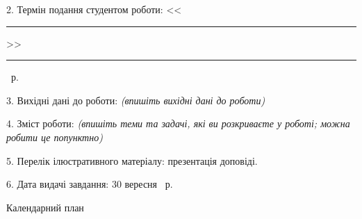 2. Термін подання студентом роботи: <<\rule{0.5cm}{0.25pt}>> \rule{2.5cm}{0.25pt} \YearOfDefence~р.

3. Вихідні дані до роботи: \emph{(впишіть вихідні дані до роботи)}

4. Зміст роботи: \emph{(впишіть теми та задачі, які ви розкриваєте у роботі; можна робити це попунктно)}

5. Перелік ілюстративного матеріалу: презентація доповіді.

6. Дата видачі завдання: 30 вересня \YearOfBeginning~р.

\newpage
\thispagestyle{empty}

\begin{center}
    Календарний план
\end{center}

